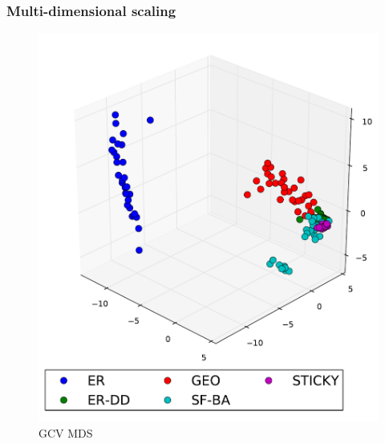 \documentclass[11pt,xcolor=table]{beamer}
\begin{document}
\begin{frame}
  \frametitle{Multi-dimensional scaling}
  
  \begin{figure}[H] 
  \captionsetup{width=8cm}
  \centering
  \begin{minipage}[b]{0.50\linewidth}
    \centering
    \includegraphics[scale=0.30]
    {../code/final_results/trade_2010_thresholded/eval_results/gcv_mds.pdf}
    \caption[Graphlet Cluster Vector MDS]{GCV MDS}
    \label{fig:gcv_mds}
  \end{minipage}%
  \begin{minipage}[b]{0.50\linewidth}
    \centering

\end{minipage}
\end{figure}
\end{frame}
\end{document}
